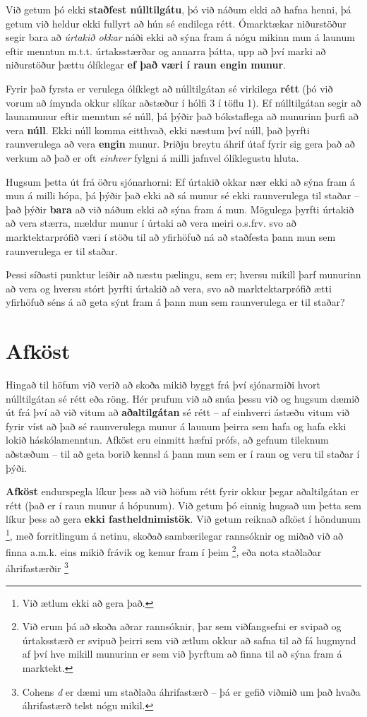 \documentclass[
]{book}
\begin{document}
Við getum þó ekki \textbf{staðfest núlltilgátu}, þó við náðum ekki að hafna henni, þá getum við heldur ekki fullyrt að hún sé endilega rétt. Ómarktækar niðurstöður segir bara að \emph{úrtakið okkar} náði ekki að sýna fram á nógu mikinn mun á launum eftir menntun m.t.t. úrtaksstærðar og annarra þátta, upp að því marki að niðurstöður þættu ólíklegar \textbf{ef það væri í raun engin munur}.

Fyrir það fyrsta er verulega ólíklegt að núlltilgátan sé virkilega \textbf{rétt} (þó við vorum að ímynda okkur slíkar aðstæður í hólfi 3 í töflu 1). Ef núlltilgátan segir að launamunur eftir menntun sé núll, þá þýðir það bókstaflega að munurinn þurfi að vera \textbf{núll}. Ekki núll komma eitthvað, ekki næstum því núll, það þyrfti raunverulega að vera \textbf{engin} munur. Þriðju breytu áhrif útaf fyrir sig gera það að verkum að það er oft \emph{einhver} fylgni á milli jafnvel ólíklegustu hluta.

Hugsum þetta út frá öðru sjónarhorni: Ef úrtakið okkar nær ekki að sýna fram á mun á milli hópa, þá þýðir það ekki að sá munur sé ekki raunverulega til staðar -- það þýðir \textbf{bara} að við náðum ekki að sýna fram á mun. Mögulega þyrfti úrtakið að vera stærra, mældur munur í úrtaki að vera meiri o.s.frv. svo að marktektarprófið væri í stöðu til að yfirhöfuð ná að staðfesta þann mun sem raunverulega er til staðar.

Þessi síðasti punktur leiðir að næstu pælingu, sem er; hversu mikill þarf munurinn að vera og hversu stórt þyrfti úrtakið að vera, svo að marktektarprófið ætti yfirhöfuð séns á að geta sýnt fram á þann mun sem raunverulega er til staðar?

\hypertarget{afkuxf6st}{%
\section{Afköst}\label{afkuxf6st}}

Hingað til höfum við verið að skoða mikið byggt frá því sjónarmiði hvort núlltilgátan sé rétt eða röng. Hér prufum við að snúa þessu við og hugsum dæmið út frá því að við vitum að \textbf{aðaltilgátan} sé rétt -- af einhverri ástæðu vitum við fyrir víst að það sé raunverulega munur á launum þeirra sem hafa og hafa ekki lokið háskólamenntun. Afköst eru einmitt hæfni prófs, að gefnum tileknum aðstæðum -- til að geta borið kennsl á þann mun sem er í raun og veru til staðar í þýði.

\textbf{Afköst} endurspegla líkur þess að við höfum rétt fyrir okkur þegar aðaltilgátan er rétt (það er í raun munur á hópunum). Við getum þó einnig hugsað um þetta sem líkur þess að gera \textbf{ekki fastheldnimistök}. Við getum reiknað afköst í höndunum \footnote{Við ætlum ekki að gera það.}, með forritlingum á netinu, skoðað sambærilegar rannsóknir og miðað við að finna a.m.k. eins mikið frávik og kemur fram í þeim \footnote{Við erum þá að skoða aðrar rannsóknir, þar sem viðfangsefni er svipað og úrtaksstærð er svipuð þeirri sem við ætlum okkur að safna til að fá hugmynd af því hve mikill munurinn er sem við þyrftum að finna til að sýna fram á marktekt.}, eða nota staðlaðar áhrifastærðir \footnote{Cohens \emph{d} er dæmi um staðlaða áhrifastærð -- þá er gefið viðmið um það hvaða áhrifastærð telst nógu mikil.}
\end{document}
